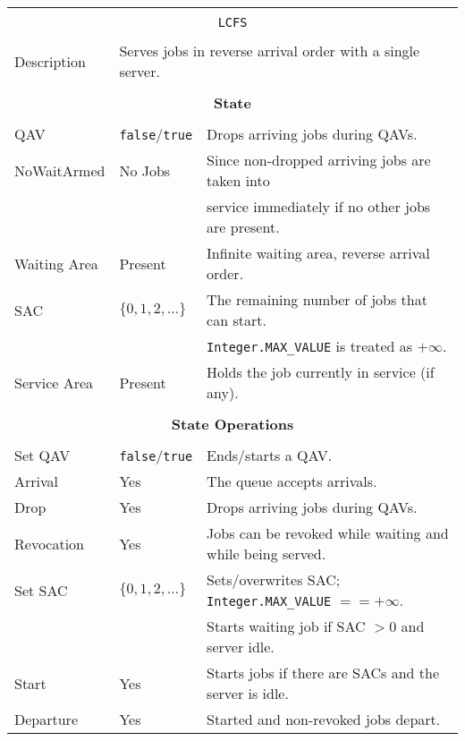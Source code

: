 \documentclass[12pt]{book}
\begin{document}
\begin{tabular}{|l|l|l|}
\hline
\multicolumn{3}{|c|}{} \\
\multicolumn{3}{|c|}{\lstinline[basicstyle=\large]{LCFS}} \\
\multicolumn{3}{|c|}{} \\
\hline
Description & \multicolumn{2}{|l|}{Serves jobs in reverse arrival order with a single server.} \\
\hline
\multicolumn{3}{|c|}{} \\
\multicolumn{3}{|c|}{\bf State} \\
\multicolumn{3}{|c|}{} \\
\hline
QAV & \lstinline|false|/\lstinline|true| & Drops arriving jobs during QAVs. \\
\hline
NoWaitArmed & No Jobs & Since non-dropped arriving jobs are taken into \\
            &         & service immediately if no other jobs are present. \\
\hline
Waiting Area & Present & Infinite waiting area, reverse arrival order. \\
\hline
SAC & $\{0, 1, 2, \ldots\}$ & The remaining number of jobs that can start. \\
    &                       & \lstinline|Integer.MAX_VALUE| is treated as $+\infty$. \\
\hline
Service Area & Present & Holds the job currently in service (if any). \\
\hline
\multicolumn{3}{|c|}{} \\
\multicolumn{3}{|c|}{\bf State Operations} \\
\multicolumn{3}{|c|}{} \\
\hline
Set QAV & \lstinline|false|/\lstinline|true| & Ends/starts a QAV. \\
\hline
Arrival & Yes & The queue accepts arrivals. \\
\hline
Drop & Yes & Drops arriving jobs during QAVs. \\
\hline
Revocation & Yes & Jobs can be revoked while waiting and while being served. \\
\hline
Set SAC & $\{0, 1, 2, \ldots\}$ & Sets/overwrites SAC; \lstinline|Integer.MAX_VALUE| $== +\infty$. \\
        &                       & Starts waiting job if SAC $> 0$ and server idle. \\
\hline
Start & Yes & Starts jobs if there are SACs and the server is idle. \\
\hline
Departure & Yes & Started and non-revoked jobs depart. \\

\end{tabular}
\end{document}
